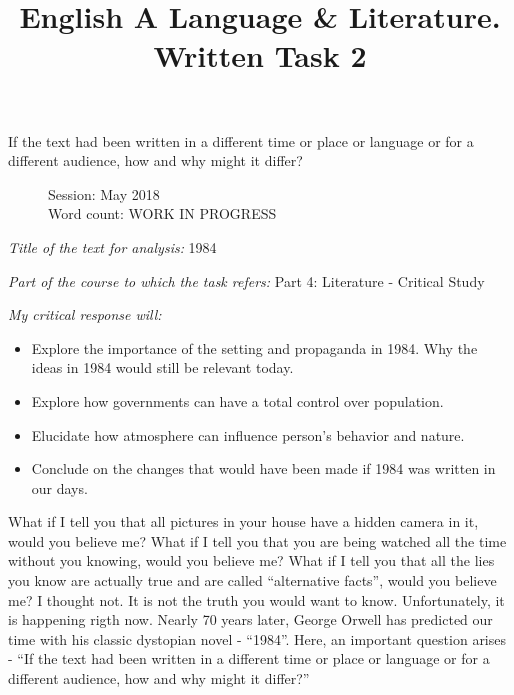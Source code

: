 \documentclass[a4paper,12pt]{article}
\title{English A Language \& Literature. Written Task 2}
\date{}
\author{}
\begin{document}
\maketitle
\begin{center}
If the text had been written in a different time or place or language or for a different audience, how and why might it differ?
\end{center}
\begin{flushleft}
\begin{figure}
Session: May 2018\\
Word count: WORK IN PROGRESS\\
\end{figure}
\end{flushleft}
\newpage

\textit{Title of the text for analysis:} 1984

\textit{Part of the course to which the task refers:} Part 4: Literature - Critical Study 

\textit{My critical response will:}

\begin{itemize}

\item Explore the importance of the setting and propaganda in 1984. Why the ideas in 1984 would still be relevant today.

  \item Explore how governments can have a total control over population.

  \item Elucidate how atmosphere can influence person's behavior and nature.

  \item Conclude on the changes that would have been made if 1984 was written in our days.
    
  \end{itemize}



What if I tell you that all pictures in your house have a hidden camera in it, would you believe me? What if I tell you that you are being watched all the time without you knowing, would you believe me?  What if I tell you that all the lies you know are actually true and are called ``alternative facts'', would you believe me? I thought not. It is not the truth you would want to know. Unfortunately, it is happening rigth now. Nearly 70 years later, George Orwell has predicted our time with his classic dystopian novel - ``1984''. Here, an important question arises - ``If the text had been written in a different time or place or language or for a different audience, how and why might it differ?'' \\
\end{document}
